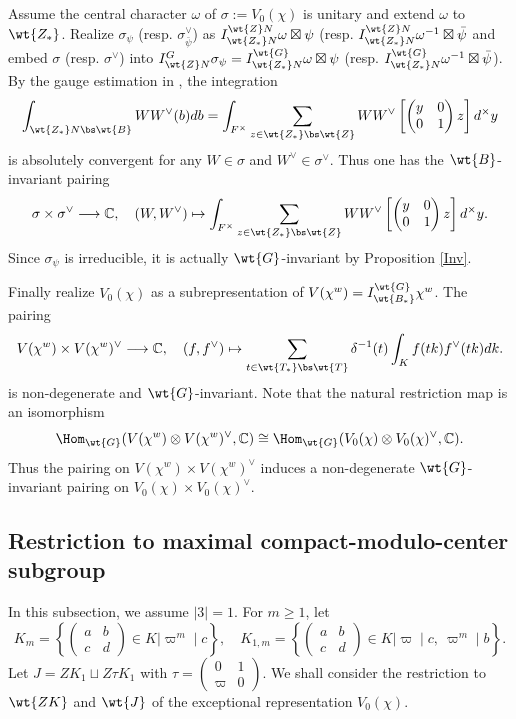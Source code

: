 \documentclass[11pt,reqno]{amsart}
\newcommand{\BC}{{\mathbb {C}}} \newcommand{\BD}{{\mathbb {D}}}
\newcommand{\lra}{\longrightarrow}\newcommand{\lla}{\longleftarrow}
\theoremstyle{plain}
\theoremstyle{remark} \newtheorem{remark}[thm]{Remark}
\theoremstyle{definition} \newtheorem{exercise}[thm]{Exercise}
\theoremstyle{definition} \newtheorem{example}[thm]{Example} \newtheorem{condition}[thm]{Condition}
\numberwithin{equation}{section}
\renewcommand{\-}{\text{--}}
\begin{document}
Assume the central character $\omega$ of $\sigma:=V_0(\chi)$ is unitary and   extend $\omega$ to $\wt{Z_*}$. Realize $\sigma_{\psi}$ (resp. $\sigma_{\bar{\psi}}^{\vee}$) as $I_{\wt{Z_*}N}^{\wt{Z}N}\omega\boxtimes\psi$ (resp. $I_{\wt{Z_*}N}^{\wt{Z}N}\omega^{-1}\boxtimes\bar{\psi}$ and embed $\sigma$ (resp. $\sigma^\vee$) into  $I_{\wt{Z}N}^{G}\sigma_\psi=I_{\wt{Z_*}N}^{\wt{G}}\omega\boxtimes\psi$ (resp. $I_{\wt{Z_*}N}^{\wt{G}}\omega^{-1}\boxtimes\bar{\psi}$). By the gauge estimation in \cite[Theorem I.4.1]{KP84}, the integration \[\int_{\wt{Z_*}N\bs \wt{B}}WW^\vee(b)db=\int_{F^\times}\sum_{z\in \wt{Z_*}\bs \wt{Z}}WW^\vee\left[\begin{pmatrix} y & 0\\ 0 & 1\end{pmatrix}z\right]d^\times y\] is absolutely convergent for any $W\in\sigma$ and $W^\vee\in\sigma^\vee$. Thus one has the $\wt{B}$-invariant pairing 
\[\sigma\times\sigma^\vee\lra\BC,\quad (W,W^\vee)\mapsto\int_{F^\times}\sum_{z\in \wt{Z_*}\bs\wt{Z}}WW^\vee\left[\begin{pmatrix}y & 0\\ 0 & 1\end{pmatrix}z\right]d^\times y.\]
Since $\sigma_{\psi}$ is irreducible, it is actually $\wt{G}$-invariant by Proposition \ref{Inv}.  


Finally realize $V_0(\chi)$ as a subrepresentation of $V(\chi^w)=I_{\wt{B_*}}^{\wt{G}}\chi^w$. 
 The pairing 
\[V(\chi^w)\times V(\chi^w)^\vee\lra\BC,\quad  (f,f^\vee)\mapsto\sum_{t\in \wt{T_*}\bs\wt{T}}\delta^{-1}(t)\int_Kf(tk)f^\vee(tk)dk.\]
is non-degenerate and $\wt{G}$-invariant. Note that the natural restriction map is an isomorphism
\[\Hom_{\wt{G}}(V(\chi^w)\otimes V(\chi^w)^\vee,\BC)\cong \Hom_{\wt{G}}(V_0(\chi)\otimes V_0(\chi)^\vee,\BC).\]
 Thus the pairing on $V(\chi^w)\times V(\chi^w)^\vee$ induces a non-degenerate $\wt{G}$-invariant pairing on $V_0(\chi)\times V_0(\chi)^\vee$.
\subsection{Restriction to maximal compact-modulo-center subgroup}\label{K-type Section}
In this subsection, we assume $|3|=1$. For $m\geq 1$, let 
\[K_m=\left\{\begin{pmatrix} a & b \\ c & d\end{pmatrix}\in K\Bigg| \varpi^m\mid c\right\},\quad K_{1,m}=\left\{\begin{pmatrix}a & b \\ c & d\end{pmatrix}\in K\Bigg| \varpi\mid c,\ \varpi^m\mid b\right\}.\]
Let $J=ZK_1\sqcup Z\tau K_1$ with $\tau=\begin{pmatrix} 0 & 1\\ \varpi & 0\end{pmatrix}$. We shall consider the restriction to $\wt{ZK}$ and $\wt{J}$ of the exceptional representation $V_0(\chi)$.
\end{document}
